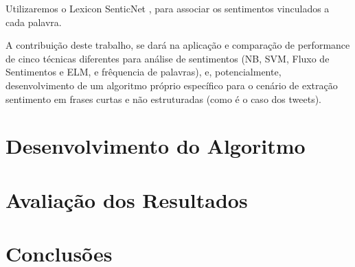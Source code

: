 \documentclass[
	12pt,				%
	openright,			%
	oneside,			%
	a4paper,			%
	english,			%
	spanish,			%
	brazil				%
	]{abntex2}
\begin{document}
Utilizaremos o Lexicon SenticNet \cite{article_Poria2014}, para associar os sentimentos vinculados a cada palavra.

A contribuição deste trabalho, se dará na aplicação e comparação de performance de cinco técnicas diferentes para análise de sentimentos (NB, SVM, Fluxo de Sentimentos e ELM, e frêquencia de palavras), e, potencialmente, desenvolvimento de um algoritmo próprio específico para o cenário de extração sentimento em frases curtas e não estruturadas (como é o caso dos tweets).


	
	\chapter{Desenvolvimento do Algoritmo}
	\chapter{Avaliação dos Resultados}
	\chapter{Conclusões}
	 
	

\postextual



	
\end{document}
